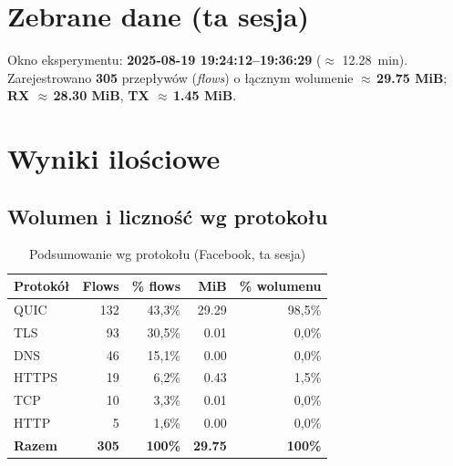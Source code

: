 \section{Zebrane dane (ta sesja)}
Okno eksperymentu: \textbf{2025-08-19 19{:}24{:}12–19{:}36{:}29} ($\approx$ \SI{12.28}{\minute}). Zarejestrowano \textbf{305} przepływów (\emph{flows}) o łącznym wolumenie \textbf{$\approx$\,29.75 MiB}; \textbf{RX $\approx$\,28.30 MiB}, \textbf{TX $\approx$\,1.45 MiB}.

\section{Wyniki ilościowe}
\subsection{Wolumen i liczność wg protokołu}
\begin{table}[H]
  \centering
  \caption{Podsumowanie wg protokołu (Facebook, ta sesja)}
  \label{tab:fb-proto}
  \begin{tabular}{lrrrr}
    \toprule
    \textbf{Protokół} & \textbf{Flows} & \textbf{\% flows} & \textbf{MiB} & \textbf{\% wolumenu} \\
    \midrule
    QUIC  & 132 & 43{,}3\% & 29.29 & 98{,}5\% \\
    TLS   & 93  & 30{,}5\% & 0.01  & 0{,}0\% \\
    DNS   & 46  & 15{,}1\% & 0.00  & 0{,}0\% \\
    HTTPS & 19  & 6{,}2\%  & 0.43  & 1{,}5\% \\
    TCP   & 10  & 3{,}3\%  & 0.01  & 0{,}0\% \\
    HTTP  & 5   & 1{,}6\%  & 0.00  & 0{,}0\% \\
    \midrule
    \textbf{Razem} & \textbf{305} & \textbf{100\%} & \textbf{29.75} & \textbf{100\%} \\
    \bottomrule
  \end{tabular}
\end{table}

